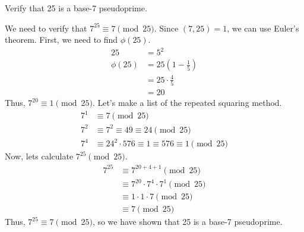 \documentclass{article}
\begin{document}
\begin{problem}{}{}
    Verify that 25 is a base-7 pseudoprime.
\end{problem}
\begin{solution}{}{}
    We need to verify that $7^{25} \equiv 7 \pmod{25}$. Since $(7,25) = 1$, we can use Euler's theorem. First, we need to find $\phi(25)$.
    \begin{align*}
        25 &= 5^2 \\
        \phi(25) &= 25 \left(1 - \frac{1}{5}\right) \\
        &= 25 \cdot \frac{4}{5} \\
        &= 20
    \end{align*}
    Thus, $7^{20} \equiv 1 \pmod{25}$. Let's make a list of the repeated squaring method.
    \begin{align*}
        7^1 &\equiv 7 \pmod{25} \\
        7^2 &\equiv 7^2 \equiv 49 \equiv 24 \pmod{25} \\
        7^4 &\equiv 24^2 \cdot 576 \equiv 1 \equiv 576 \equiv 1 \pmod{25}
    \end{align*}
    Now, lets calculate $7^{25}\pmod{25}$.
    \begin{align*}
        7^{25} &\equiv 7^{20+4+1} \pmod{25} \\
        &\equiv 7^{20} \cdot 7^4 \cdot 7^1 \pmod{25} \\
        &\equiv 1 \cdot 1 \cdot 7 \pmod{25} \\
        &\equiv 7 \pmod{25}
    \end{align*}
    Thus, $7^{25} \equiv 7 \pmod{25}$, so we have shown that 25 is a base-7 pseudoprime.
\end{solution}
\end{document}
